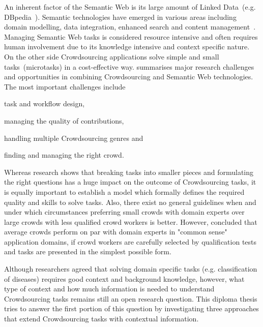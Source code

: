 An inherent factor of the Semantic Web is its large amount of Linked Data~(e.g. DBpedia~\cite{lehmann2015}). Semantic technologies have emerged in various areas including domain modelling, data integration, enhanced search and content management~\cite{semantic-web-usecases}. Managing Semantic Web tasks is considered resource intensive and often requires human involvement due to its knowledge intensive and context specific nature. On the other side Crowdsourcing applications solve simple and small tasks~(microtasks) in a cost-effective way. \cite{sarasua2015crowdsourcing} summarises major research challenges and opportunities in combining Crowdsourcing and Semantic Web technologies. The most important challenges include 
\begin{inparaenum}[1)]
		\item task and workflow design,
		\item managing the quality of contributions,
		\item handling multiple Crowdsourcing genres and 
		\item finding and managing the right crowd.
\end{inparaenum}
Whereas research shows that breaking tasks into smaller pieces and formulating the right questions has a huge impact on the outcome of Crowdsourcing tasks, it is equally important to establish a model which formally defines the required quality and skills to solve tasks. Also, there exist no general guidelines when and under which circumstances preferring small crowds with domain experts over large crowds with less qualified crowd workers is better. However, \cite{mortensen2013} concluded that average crowds perform on par with domain experts in "common sense" application domains, if crowd workers are carefully selected by qualification tests and tasks are presented in the simplest possible form.

Although researchers agreed that solving domain specific tasks (e.g. classification of diseases) requires good context and background knowledge, however, what type of context and how much information is needed to understand Crowdsourcing tasks remains still an open research question.
This diploma thesis tries to answer the first portion of this question by investigating three approaches that extend Crowdsourcing tasks with contextual information. 
